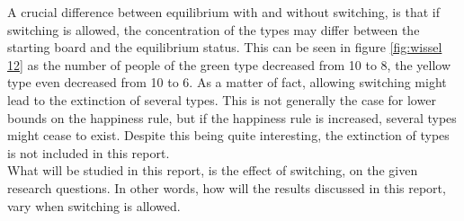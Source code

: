 A crucial difference between equilibrium with and without switching, is that if switching is allowed, the concentration of the types may differ between the starting board and the equilibrium status. 
This can be seen in figure \ref{fig:wissel 12} as the number of people of the green type decreased from 10 to 8, the yellow type even decreased from 10 to 6. 
As a matter of fact, allowing switching might lead to the extinction of several types. 
This is not generally the case for lower bounds on the happiness rule, but if the happiness rule is increased, several types might cease to exist. Despite this being quite interesting, the extinction of types is not included in this report.\\
What will be studied in this report, is the effect of switching, on the given research questions. In other words, how will the results discussed in this report, vary when switching is allowed. 
\newpage


